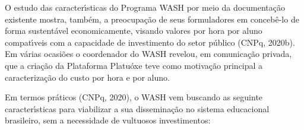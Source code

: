 \documentclass[
12pt,		%
openright,	%
twoside,  %
a4paper,			%
chapter=TITLE,		%
english,			%
french,				%
spanish,			%
brazil				%
]{USPSC-classe/USPSC}
\begin{document}
O estudo das caracter\'{\i}sticas do Programa WASH por meio da documenta\c{c}\~ao existente mostra, tamb\'em, a preocupa\c{c}\~ao de seus formuladores em conceb\^e-lo de forma sustent\'avel economicamente, visando valores por hora por aluno compat\'{\i}veis com a capacidade de investimento do setor p\'ublico  (CNPq, 2020b). Em v\'arias ocasi\~oes o coordenador do WASH revelou, em comunica\c{c}\~ao privada, que a cria\c{c}\~ao da Plataforma Platu\'oxe teve como motiva\c{c}\~ao principal a caracteriza\c{c}\~ao do custo por hora e por aluno.








Em termos pr\'aticos  (CNPq, 2020), o WASH vem buscando as seguinte caracter\'{\i}sticas para viabilizar a sua dissemina\c{c}\~ao no sistema educacional brasileiro, sem a necessidade de vultuosos investimentos:
\end{document}
